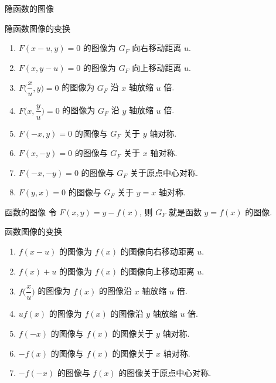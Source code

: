 \begin{frame}{隐函数的图像\noexer}
	\onslide<+->
	\begin{block}{隐函数图像的变换}
		\begin{enumerate}
			\item $F(x-u,y)=0$ 的图像为 $G_F$ 向右移动距离 $u$.
			\item $F(x,y-u)=0$ 的图像为 $G_F$ 向上移动距离 $u$.
			\item $F\bigl(\dfrac xu,y\bigr)=0$ 的图像为 $G_F$ 沿 $x$ 轴放缩 $u$ 倍.
			\item $F\bigl(x,\dfrac yu\bigr)=0$ 的图像为 $G_F$ 沿 $y$ 轴放缩 $u$ 倍.
			\item $F(-x,y)=0$ 的图像与 $G_F$ 关于 $y$ 轴对称.
			\item $F(x,-y)=0$ 的图像与 $G_F$ 关于 $x$ 轴对称.
			\item $F(-x,-y)=0$ 的图像与 $G_F$ 关于原点中心对称.
			\item $F(y,x)=0$ 的图像与 $G_F$ 关于 $y=x$ 轴对称.
		\end{enumerate}
	\end{block}
\end{frame}


\begin{frame}{函数的图像\noexer}
	\onslide<+->
	令 $F(x,y)=y-f(x)$, 则 $G_F$ 就是函数 $y=f(x)$ 的图像.
	\onslide<+->
	\begin{block}{函数图像的变换}
		\begin{enumerate}
			\item $f(x-u)$ 的图像为 $f(x)$ 的图像向右移动距离 $u$.
			\item $f(x)+u$ 的图像为 $f(x)$ 的图像向上移动距离 $u$.
			\item $f\bigl(\dfrac xu\bigr)$ 的图像为 $f(x)$ 的图像沿 $x$ 轴放缩 $u$ 倍.
			\item $uf(x)$ 的图像为 $f(x)$ 的图像沿 $y$ 轴放缩 $u$ 倍.
			\item $f(-x)$ 的图像与 $f(x)$ 的图像关于 $y$ 轴对称.
			\item $-f(x)$ 的图像与 $f(x)$ 的图像关于 $x$ 轴对称.
			\item $-f(-x)$ 的图像与 $f(x)$ 的图像关于原点中心对称.
		\end{enumerate}
	\end{block}
\end{frame}



